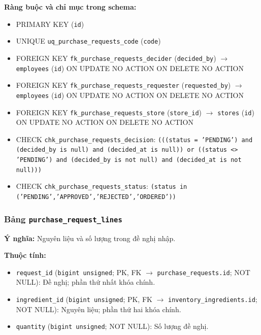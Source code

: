 \textbf{Ràng buộc và chỉ mục trong schema:}

\begin{itemize}

\item PRIMARY KEY (\texttt{id})

\item UNIQUE \texttt{uq\_purchase\_requests\_code} (\texttt{code})

\item FOREIGN KEY \texttt{fk\_purchase\_requests\_decider} (\texttt{decided\_by}) $\rightarrow$ \texttt{employees} (\texttt{id}) ON UPDATE NO ACTION ON DELETE NO ACTION

\item FOREIGN KEY \texttt{fk\_purchase\_requests\_requester} (\texttt{requested\_by}) $\rightarrow$ \texttt{employees} (\texttt{id}) ON UPDATE NO ACTION ON DELETE NO ACTION

\item FOREIGN KEY \texttt{fk\_purchase\_requests\_store} (\texttt{store\_id}) $\rightarrow$ \texttt{stores} (\texttt{id}) ON UPDATE NO ACTION ON DELETE NO ACTION

\item CHECK \texttt{chk\_purchase\_requests\_decision}: \texttt{(((status = 'PENDING') and (decided\_by is null) and (decided\_at is null)) or ((status <> 'PENDING') and (decided\_by is not null) and (decided\_at is not null)))}

\item CHECK \texttt{chk\_purchase\_requests\_status}: \texttt{(status in ('PENDING','APPROVED','REJECTED','ORDERED'))}

\end{itemize}

\subsubsection{Bảng \texttt{purchase\_request\_lines}}

\textbf{Ý nghĩa:} Nguyên liệu và số lượng trong đề nghị nhập.\par

\textbf{Thuộc tính:}

\begin{itemize}

\item \texttt{request\_id} (\texttt{bigint unsigned}; PK, FK $\rightarrow$ \texttt{purchase\_requests.id}; NOT NULL): Đề nghị; phần thứ nhất khóa chính.

\item \texttt{ingredient\_id} (\texttt{bigint unsigned}; PK, FK $\rightarrow$ \texttt{inventory\_ingredients.id}; NOT NULL): Nguyên liệu; phần thứ hai khóa chính.

\item \texttt{quantity} (\texttt{bigint unsigned}; NOT NULL): Số lượng đề nghị.

\end{itemize}

